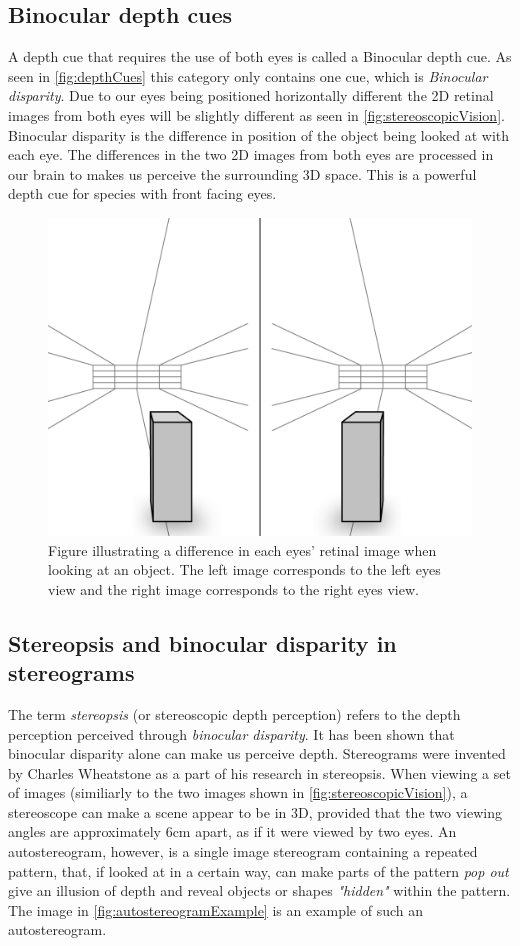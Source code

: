 \subsection{Binocular depth cues}\label{sec:binocularDepthCues}
A depth cue that requires the use of both eyes is called a Binocular depth cue. As seen in \autoref{fig:depthCues} this category only contains one cue, which is \textit{Binocular disparity}. Due to our eyes being positioned horizontally different the 2D retinal images from both eyes will be slightly different as seen in \autoref{fig:stereoscopicVision}. Binocular disparity is the difference in position of the object being looked at with each eye\citep[p.~208]{sensationPerception}. The differences in the two 2D images from both eyes are processed in our brain to makes us perceive the surrounding 3D space. This is a powerful depth cue for species with front facing eyes\citep{seeingInThreeDimensions}.
\begin{figure}[H]
	\centering
	\includegraphics[width=0.6\linewidth]{figure/Analysis/stereoScopicVision.png}
	\caption{Figure illustrating a difference in each eyes' retinal image when looking at an object. The left image corresponds to the left eyes view and the right image corresponds to the right eyes view.}
	\label{fig:stereoscopicVision}
\end{figure}


\subsection{Stereopsis and binocular disparity in stereograms}\label{sec:stereograms}
The term \textit{stereopsis} (or stereoscopic depth perception) refers to the depth perception perceived through \textit{binocular disparity}\citep{sensationPerception,seeingInThreeDimensions}. It has been shown that binocular disparity alone can make us perceive depth\citep{autostereograms}. Stereograms were invented by Charles Wheatstone as a part of his research in stereopsis. 
When viewing a set of images (similiarly to the two images shown in \autoref{fig:stereoscopicVision}), a stereoscope can make a scene appear to be in 3D, provided that the two viewing angles are approximately 6cm apart, as if it were viewed by two eyes\citep[p.~212]{sensationPerception}. 
An autostereogram, however, is a single image stereogram containing a repeated pattern, that, if looked at in a certain way, can make parts of the pattern \textit{pop out} give an illusion of depth and reveal objects or shapes \textit{"hidden"} within the pattern\citep{autostereograms}. The image in \autoref{fig:autostereogramExample} is an example of such an autostereogram.

